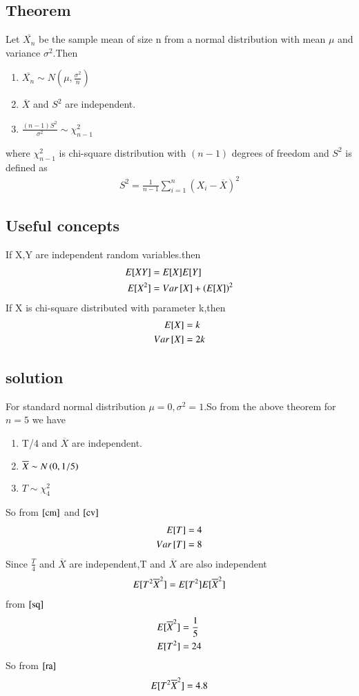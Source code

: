 \documentclass[journal,12pt,twocolumn]{IEEEtran}
\begin{document}
\subsection{Theorem}
Let $\overline{X_n}$ be the sample mean of size n from a normal distribution with mean $\mu$ and variance $\sigma^2$.Then \begin{enumerate}
    \item $\overline{X_n} \sim N(\mu,\frac{\sigma^2}{n})$
    \item $\overline{X}$ and $S^2$ are independent.
    \item $\frac{(n-1)S^2}{\sigma^2} \sim \chi_{n-1}^2$
\end{enumerate} 
where $\chi_{n-1}^2$  is  chi-square distribution
with   $(n-1)$ degrees of freedom and $S^2$ is defined as
\begin{align}
    S^2=\frac{1}{n-1}\sum_{i=1}^{n}(X_i-\overline{X})^2
\end{align}
\subsection{Useful concepts}
If X,Y are independent random variables.then
\begin{align}
    E[ XY ]&=E[ X ]E[ Y ]\\
    E[ X^2 ]&=Var{}\left[X\right]+\left(E[ X ]\right)^2\label{sq}
\end{align}
If X is chi-square distributed with parameter k,then
\begin{align}
    E[ X ]&=k\label{cm}\\
    Var{}\left[X\right]&=2k\label{cv}
\end{align}
\subsection{solution}
For standard normal distribution $\mu=0,\sigma^2=1$.So from the above theorem for $n=5$ we have
\begin{enumerate}
    \item T/4 and $\overline{X}$ are independent.
    \item $\overline{X} \sim N\left(0,1/5\right)$
    \item $T \sim \chi_4^2$
\end{enumerate}
So from $\eqref{cm}$ and $\eqref{cv}$
\begin{align}
    E[ T ]=4\\
    Var{}\left[T\right]=8
\end{align}
Since $\frac{T}{4}$ and $\overline{X}$ are independent,T and $\overline{X}$ are also independent
\begin{align}
    E[ T^2\overline{X}^2 ]=E[ T^2 ]E[ \overline{X}^2 ]\label{ra}
\end{align}
from $\eqref{sq}$ 
\begin{align}
    E[ \overline{X}^2 ]&=\frac{1}{5}\\
    E[ T^2 ]&=24
\end{align}
So from $\eqref{ra}$
\begin{align}
    E[ T^2\overline{X}^2 ]=4.8
\end{align}
\end{document}
